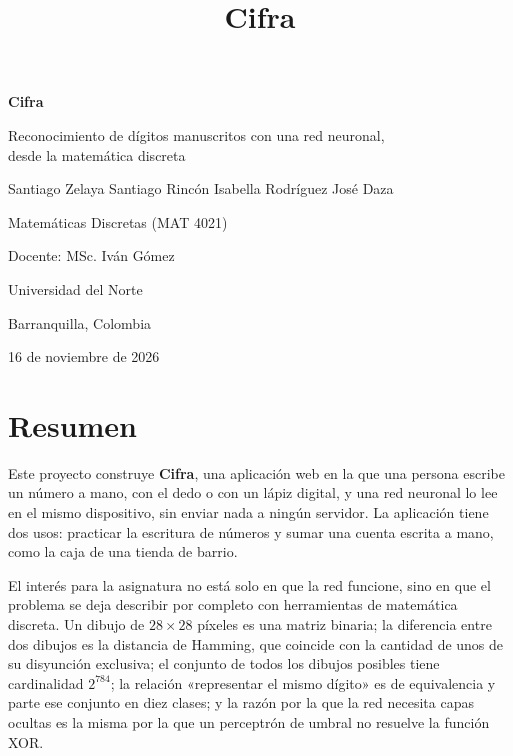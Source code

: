 \documentclass[12pt,letterpaper]{article}
\title{Cifra}
\author{}
\date{}
\begin{document}
\begin{titlepage}
\centering
\vspace*{3.2cm}

{\Huge\bfseries Cifra\par}
\vspace{0.9cm}
{\Large Reconocimiento de dígitos manuscritos con una red neuronal,\\[2pt]
desde la matemática discreta\par}

\vspace{2.6cm}
{\large Santiago Zelaya \quad Santiago Rincón \quad Isabella Rodríguez \quad José Daza\par}

\vspace{2.2cm}
{\large Matemáticas Discretas (MAT 4021)\par}
\vspace{0.3cm}
{\large Docente: MSc. Iván Gómez\par}

\vspace{1.4cm}
{\large Universidad del Norte\par}
{\large Barranquilla, Colombia\par}

\vfill
{\large 16 de noviembre de 2026\par}
\end{titlepage}

\tableofcontents
\newpage
{}

\section{Resumen}

Este proyecto construye \textbf{Cifra}, una aplicación web en la que una persona
escribe un número a mano, con el dedo o con un lápiz digital, y una red neuronal
lo lee en el mismo dispositivo, sin enviar nada a ningún servidor. La aplicación
tiene dos usos: practicar la escritura de números y sumar una cuenta escrita a
mano, como la caja de una tienda de barrio.

El interés para la asignatura no está solo en que la red funcione, sino en que el
problema se deja describir por completo con herramientas de matemática discreta.
Un dibujo de $28\times28$ píxeles es una matriz binaria; la diferencia entre dos
dibujos es la distancia de Hamming, que coincide con la cantidad de unos de su
disyunción exclusiva; el conjunto de todos los dibujos posibles tiene cardinalidad
$2^{784}$; la relación «representar el mismo dígito» es de equivalencia y parte
ese conjunto en diez clases; y la razón por la que la red necesita capas ocultas
es la misma por la que un perceptrón de umbral no resuelve la función XOR.
\end{document}
